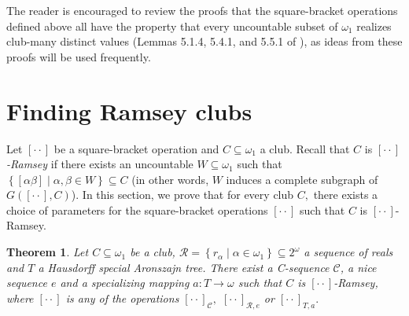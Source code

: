 \documentclass{article}
\newtheorem{theorem}{Theorem}
\begin{document}
\qquad\qquad\qquad\qquad\qquad

The reader is encouraged to review the proofs that the square-bracket
operations defined above all have the property that every uncountable subset
of $\omega_{1}$ realizes club-many distinct values (Lemmas 5.1.4, 5.4.1, and
5.5.1 of \cite{Walks}), as ideas from these proofs will be used frequently.

\section{Finding Ramsey clubs \label{Finding Ramsey clubs}}

Let $[\cdot\cdot]$ be a square-bracket operation and $C\subseteq\omega_{1}$ a
club. Recall that $C$ is $[\cdot\cdot]$\emph{-Ramsey }if there exists an
uncountable $W\subseteq\omega_{1}$ such that $\left\{  \left[  \alpha
\beta\right]  \mid\alpha,\beta\in W\right\}  \subseteq C$ (in other words, $W$
induces a complete subgraph of $G([\cdot\cdot],C)$). In this section, we prove
that for every club $C,$ there exists a choice of parameters for the
square-bracket operations $[\cdot\cdot]$ such that $C$ is $[\cdot\cdot]$-Ramsey.

\begin{theorem}
Let $C\subseteq\omega_{1}$ be a club, $\mathcal{R}=\left\{  r_{\alpha}%
\mid\alpha\in\omega_{1}\right\}  \subseteq2^{\omega}$ a sequence of reals and
$T$ a Hausdorff special Aronszajn tree. There exist a \textsf{C}-sequence
$\mathcal{C}$, a nice sequence $e$ and a specializing mapping
$a:T\longrightarrow\omega$ such that $C$ is $[\cdot\cdot]$\emph{-}Ramsey,
where $[\cdot\cdot]$\emph{ }is\emph{ }any of the operations $[\cdot
\cdot]_{\mathcal{C}},$ $[\cdot\cdot]_{\mathcal{R},e}$ or $[\cdot\cdot]_{T,a}.$
\label{Teorema Todo club es Ramsey}
\end{theorem}
\end{document}
